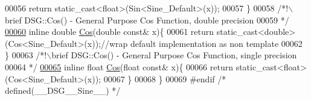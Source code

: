 \begin{DoxyCode}
00056         \textcolor{keywordflow}{return} \textcolor{keyword}{static\_cast<}\textcolor{keywordtype}{float}\textcolor{keyword}{>}(Sin<Sine\_Default>(x));
00057     \}\textcolor{comment}{}
00058 \textcolor{comment}{    /*!\(\backslash\)brief DSG::Cos() - General Purpose Cos Function, double precision}
00059 \textcolor{comment}{     */}
\hypertarget{_sine_8h_source_l00060}{}\hyperlink{namespace_d_s_g_ade303ad15c77f534429305c3cbd90191}{00060}     \textcolor{keyword}{inline} \textcolor{keywordtype}{double} \hyperlink{namespace_d_s_g_ade303ad15c77f534429305c3cbd90191}{Cos}(\textcolor{keywordtype}{double} \textcolor{keyword}{const}& x)\{
00061         \textcolor{keywordflow}{return} \textcolor{keyword}{static\_cast<}\textcolor{keywordtype}{double}\textcolor{keyword}{>}(Cos<Sine\_Default>(x));\textcolor{comment}{//wrap default implementation as non template}
00062     \}\textcolor{comment}{}
00063 \textcolor{comment}{    /*!\(\backslash\)brief DSG::Cos() - General Purpose Cos Function, single precision}
00064 \textcolor{comment}{     */}
\hypertarget{_sine_8h_source_l00065}{}\hyperlink{namespace_d_s_g_a214b00c1735dd1976757f284dfe6fb1f}{00065}     \textcolor{keyword}{inline} \textcolor{keywordtype}{float} \hyperlink{namespace_d_s_g_ade303ad15c77f534429305c3cbd90191}{Cos}(\textcolor{keywordtype}{float} \textcolor{keyword}{const}& x)\{
00066         \textcolor{keywordflow}{return} \textcolor{keyword}{static\_cast<}\textcolor{keywordtype}{float}\textcolor{keyword}{>}(Cos<Sine\_Default>(x));
00067     \}
00068 \}
00069 \textcolor{preprocessor}{#endif }\textcolor{comment}{/* defined(\_\_DSG\_\_Sine\_\_) */}\textcolor{preprocessor}{}
\end{DoxyCode}
